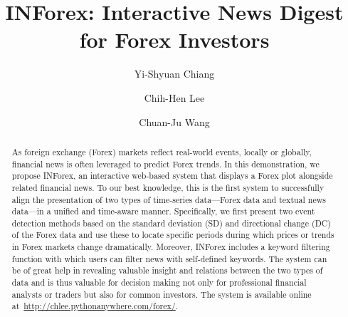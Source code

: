\documentclass[sigconf]{acmart}
\begin{document}
  \title{INForex: Interactive News Digest for Forex Investors}   %


\author{Yi-Shyuan Chiang}
  
\author{Chih-Hen Lee}
\authornotemark[1]

\author{Chuan-Ju Wang}


\renewcommand{\shortauthors}{Chiang, Lee, and Wang}

\begin{abstract}
As foreign exchange (Forex) markets reflect real-world events, locally or
globally,
financial news is often leveraged to predict Forex trends.
In this demonstration, we propose INForex, an interactive web-based system that
displays a Forex plot alongside related financial news.
To our best knowledge, this is the first system to successfully align the
presentation of two types of time-series data---Forex data and textual
news data---in a unified and time-aware manner. 
Specifically, we first present two event detection methods based on the
standard deviation (SD) and directional change (DC) of the Forex data and use
these to locate specific periods during which prices or trends in Forex markets
change dramatically.
Moreover, INForex includes a keyword filtering function with which users can
filter news with self-defined keywords.
The system can be of great help in revealing valuable insight and relations
between the two types of data and is thus valuable for decision making
not only for professional financial analysts or traders but also for common
investors.
The system is available online at~\url{http://chlee.pythonanywhere.com/forex/}.
\end{abstract}
\end{document}
